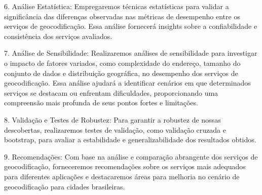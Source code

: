 \documentclass{article}
\begin{document}
6. Análise Estatística: Empregaremos técnicas estatísticas para validar a significância das diferenças observadas nas métricas de desempenho entre os serviços de geocodificação. Essa análise fornecerá insights sobre a confiabilidade e consistência dos serviços avaliados.

7. Análise de Sensibilidade: Realizaremos análises de sensibilidade para investigar o impacto de fatores variados, como complexidade do endereço, tamanho do conjunto de dados e distribuição geográfica, no desempenho dos serviços de geocodificação. Essa análise ajudará a identificar cenários em que determinados serviços se destacam ou enfrentam dificuldades, proporcionando uma compreensão mais profunda de seus pontos fortes e limitações.

8. Validação e Testes de Robustez: Para garantir a robustez de nossas descobertas, realizaremos testes de validação, como validação cruzada e bootstrap, para avaliar a estabilidade e generalizabilidade dos resultados obtidos.

9. Recomendações: Com base na análise e comparação abrangente dos serviços de geocodificação, forneceremos recomendações sobre os serviços mais adequados para diferentes aplicações e destacaremos áreas para melhoria no cenário de geocodificação para cidades brasileiras.

   
 



\end{document}
